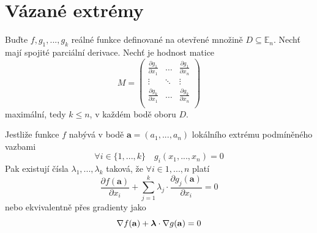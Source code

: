 \documentclass[../main.tex]{subfiles}
\begin{document}
\section{Vázané extrémy}

\begin{theorem}
	Buďte $f,g_1, ... , g_k$ reálné funkce definované na otevřené množině $D \subseteq \mathbb{E}_n$.
	Nechť mají spojité parciální derivace. Nechť je hodnost matice
	\[ M = \begin{pmatrix}
	\frac{\partial g_1}{\partial x_1} & \dots & \frac{\partial g_1}{\partial x_n}\\
	\vdots & \ddots & \vdots\\
	\frac{\partial g_k}{\partial x_1} & \dots & \frac{\partial g_k}{\partial x_n}\\
	\end{pmatrix}\]
	maximální, tedy $k \leq n$, v každém bodě oboru $D$.

	Jestliže funkce $f$ nabývá v bodě $\mathbf{a} = (a_1, ... , a_n)$ lokálního extrému podmíněného vazbami
	\[ \forall i \in \{ 1, ... , k \} \quad g_i(x_1, ... , x_n) = 0\]
	Pak existují čísla $\lambda _1, ... , \lambda _k$ taková, že $\forall i \in {1, ... , n}$ platí
	\[ \frac{\partial f(\mathbf{a})}{\partial x_i} + \sum_{j=1}^{k}\lambda_j \cdot \frac{\partial g_j(\mathbf{a})}{\partial x_i} = 0 \]
	nebo ekvivalentně přes gradienty jako
	\[ \nabla f(\mathbf{a}) + \mbox{\boldmath$\lambda$} \cdot \nabla g(\mathbf{a}) = 0\]
\end{theorem}
\end{document}
